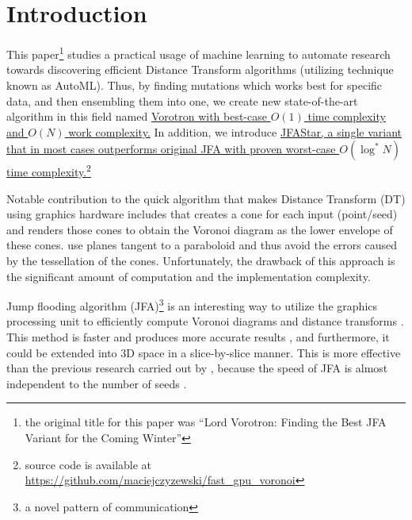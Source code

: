 \documentclass[format=acmsmall,screen,review,authordraft,nonacm]{acmart}
\newcommand{\ourjfasingle}{JFAStar}
\newcommand{\ourjfa}{Vorotron} %
\begin{document}


\maketitle

\section{Introduction} %

This paper\footnote{the original title for this paper was ``Lord Vorotron:
Finding the Best JFA Variant for the Coming Winter''} studies a practical usage
of machine learning to automate research towards discovering efficient Distance
Transform algorithms (utilizing technique known as AutoML).  Thus, by finding
mutations which works best for specific data, and then ensembling them into one,
we create new state-of-the-art algorithm in this field named \uline{\ourjfa
\hspace{0.01cm} with best-case $O(1)$ time complexity and $O(N)$ work
complexity.} In addition, we introduce \uline{\ourjfasingle, a single variant
that in most cases outperforms original JFA with proven worst-case
$O(\log^{*}N)$ time complexity.}\footnote{source code is available at
\url{https://github.com/maciejczyzewski/fast_gpu_voronoi}}

Notable contribution to the quick algorithm that makes Distance Transform (DT)
using graphics hardware includes \citep{hoff1999fast} that creates a cone for
each input (point/seed) and renders those cones to obtain the Voronoi diagram as
the lower envelope of these cones.  \cite{fischer2006fast} use planes tangent to
a paraboloid and thus avoid the errors caused by the tessellation of the cones.
Unfortunately, the drawback of this approach is the significant amount of
computation and the implementation complexity.

Jump flooding algorithm (JFA)\footnote{a novel pattern of communication} is an
interesting way to utilize the graphics processing unit to efficiently compute
Voronoi diagrams and distance transforms \cite{rong2006jump}. This method is
faster and produces more accurate results \cite{rong2007variants}, and
furthermore, it could be extended into 3D space in a slice-by-slice manner.
This is more effective than the previous research carried out by
\citep{sud2006interactive}, because the speed of JFA is almost independent to
the number of seeds \cite{rong2007variants}.
\end{document}
